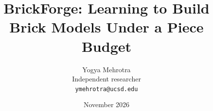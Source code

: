 \documentclass[10pt]{article}
\title{\textbf{BrickForge: Learning to Build Brick Models Under a Piece Budget}}
\author{Yogya Mehrotra\\ \small Independent researcher \\ \small \texttt{ymehrotra@ucsd.edu}}
\date{November 2026}
\begin{document}
\maketitle

\begin{abstract}

\end{abstract}













\appendix

\end{document}
